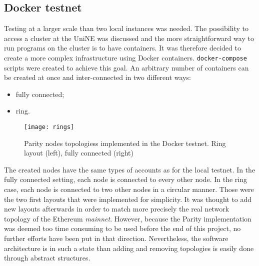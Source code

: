 \subsection{Docker testnet}
Testing at a larger scale than two local instances was needed. The possibility
to access a cluster at the UniNE was discussed and the more straightforward way
to run programs on the cluster is to have containers. It was therefore decided
to create a more complex infrastructure using Docker containers.
\texttt{docker-compose} scripts were created to achieve this goal. An arbitrary
number of containers can be created at once and inter-connected in two different
ways:
\begin{itemize}
    \item fully connected;
    \item ring.
\end{itemize}

\begin{figure}
	\centering
	\texttt{[image: rings]}
  \captionsetup{justification=centering}
    \caption{Parity nodes topologiess implemented in the Docker testnet. Ring
    layout (left), fully connected (right)}
	\label{fig:example2}
\end{figure}

The created nodes have the same types of accounts as for the local testnet.
In the fully connected setting, each node is connected to every other node. In
the ring case, each node is connected to two other nodes in a circular manner.
Those were the two first layouts that were implemented for simplicity. It was
thought to add new layouts afterwards in order to match more precisely the real
network topology of the Ethereum \textit{mainnet}. However, because the Parity
implementation was deemed too time consuming to be used before the end of this
project, no further efforts have been put in that direction. Nevertheless, the
software architecture is in such a state than adding and removing topologies is
easily done through abstract structures.
